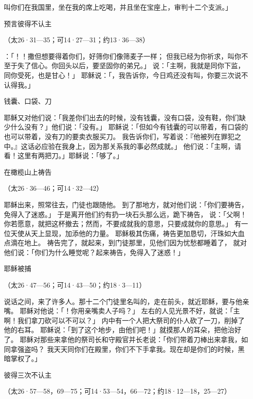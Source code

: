 {叫你们在我国里，坐在我的席上吃喝，并且坐在宝座上，审判{}十二个支派。」
\par }{\SH 预言彼得不认主
\par }{\R （太26·31—35；可14·27—31；约13·36—38）
\par }{\PP {}：「{}！{}！撒但想要得着你们，好筛你们像筛麦子一样；
但我已经为你祈求，叫你不至于失了信心。你回头以后，要坚固你的弟兄。」
说：「主啊，我就是同你下监，同你受死，也是甘心！」
耶稣说：「{}，我告诉你，今日鸡还没有叫，你要三次说不认得我。」
\par }{\SH 钱囊、口袋、刀
\par }{\PP {}耶稣又对他们说：「我差你们出去的时候，没有钱囊，没有口袋，没有鞋，你们缺少什么没有？」他们说：「没有。」
耶稣说：「但如今有钱囊的可以带着，有口袋的也可以带着，没有刀的要卖衣服买刀。
我告诉你们，{}写着说：『他被列在罪犯之中。』这话必应验在我身上，因为那关系我的事必然成就。」
他们说：「主啊，请看！这里有两把刀。」耶稣说：「够了。」
\par }{\SH 在橄榄山上祷告
\par }{\R （太26·36—46；可14·32—42）
\par }{\PP {}耶稣出来，照常往{}去，门徒也跟随他。
到了那地方，就对他们说：「你们要祷告，免得入了迷惑。」
于是离开他们约有扔一块石头那么远，跪下祷告，
说：「父啊！你若愿意，就把这杯撤去；然而，不要成就我的意思，只要成就你的意思。」
有一位天使从天上显现，加添他的力量。
耶稣极其伤痛，祷告更加恳切，汗珠如大血点滴在地上。
祷告完了，就起来，到门徒那里，见他们因为忧愁都睡着了，
就对他们说：「你们为什么睡觉呢？起来祷告，免得入了迷惑！」
\par }{\SH 耶稣被捕
\par }{\R （太26·47—56；可14·43—50；约18·3—11）
\par }{\PP {}说话之间，来了许多人。那十二个门徒里名叫{}的，走在前头，就近耶稣，要与他亲嘴。
耶稣对他说：「{}！你用亲嘴{}卖人子吗？」
左右的人见光景不好，就说：「主啊！我们拿刀砍可以不可以？」
内中有一个人把大祭司的仆人砍了一刀，削掉了他的右耳。
耶稣说：「到了这个地步，由他们吧！」就摸那人的耳朵，把他治好了。
耶稣对那些来拿他的祭司长和守殿官并长老说：「你们带着刀棒出来拿我，如同拿强盗吗？
我天天同你们在殿里，你们不下手拿我。现在却是你们的时候，黑暗掌权了。」
\par }{\SH 彼得三次不认主
\par }{\R （太26·57—58，69—75；可14·53—54，66—72；约18·12—18，25—27）
}
